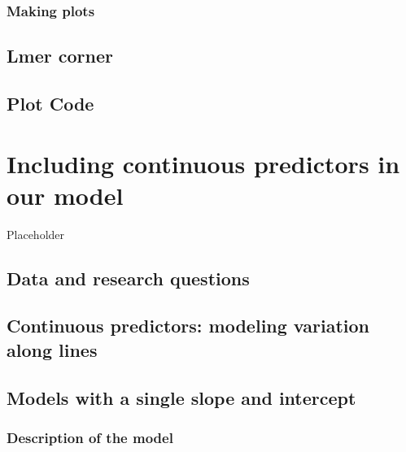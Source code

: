 \documentclass[
]{book}
\begin{document}
\hypertarget{making-plots}{%
\subsection{Making plots}\label{making-plots}}

\hypertarget{lmer-corner-2}{%
\section{Lmer corner}\label{lmer-corner-2}}

\hypertarget{plot-code-3}{%
\section{Plot Code}\label{plot-code-3}}

\hypertarget{including-continuous-predictors-in-our-model}{%
\chapter{Including continuous predictors in our model}\label{including-continuous-predictors-in-our-model}}

Placeholder

\hypertarget{data-and-research-questions-4}{%
\section{Data and research questions}\label{data-and-research-questions-4}}

\hypertarget{continuous-predictors-modeling-variation-along-lines}{%
\section{Continuous predictors: modeling variation along lines}\label{continuous-predictors-modeling-variation-along-lines}}

\hypertarget{models-with-a-single-slope-and-intercept}{%
\section{Models with a single slope and intercept}\label{models-with-a-single-slope-and-intercept}}

\hypertarget{description-of-the-model-4}{%
\subsection{Description of the model}\label{description-of-the-model-4}}
\end{document}
